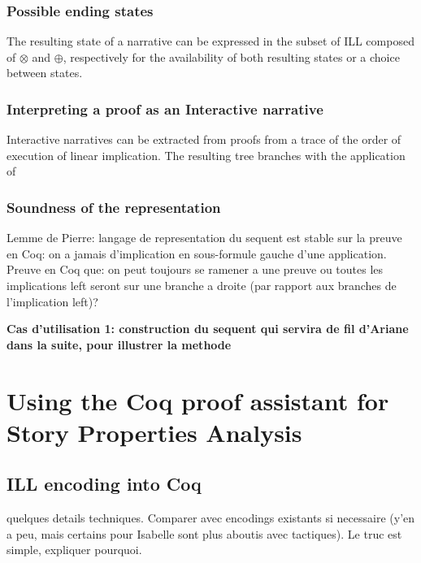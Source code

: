 \documentclass[runningheads,a4paper]{llncs}
\begin{document}
\subsubsection{Possible ending states}
The resulting state of a narrative can be expressed in the subset of ILL composed of $\otimes$ and $\oplus$, respectively for the availability of both resulting states or a choice between states. 
\subsubsection{Interpreting a proof as an Interactive narrative}
Interactive narratives can be extracted from proofs from a trace of the order of execution of linear implication. The resulting tree branches with the application of 
\subsubsection{Soundness of the representation}
Lemme de Pierre: langage de representation du sequent est stable sur la preuve en Coq: on a jamais d'implication en sous-formule gauche d'une application.
Preuve en Coq que: on peut toujours se ramener a une preuve ou toutes les implications left seront sur une branche a droite (par rapport aux branches de l'implication left)?


\textbf{Cas d'utilisation 1: construction du sequent qui servira de fil d'Ariane dans la suite, pour illustrer la methode}
\section{Using the Coq proof assistant for Story Properties Analysis}
\subsection{ILL encoding into Coq}
quelques details techniques. Comparer avec encodings existants si necessaire (y'en a peu, mais certains pour Isabelle sont plus aboutis avec tactiques). Le truc est simple, expliquer pourquoi.
\end{document}
